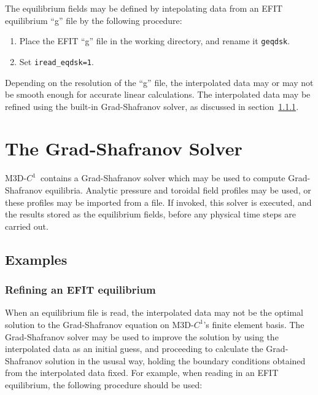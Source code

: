 \documentclass[letterpaper]{book}
\newcommand{\codename}{\textsc{M3D-$C^1$}}
\begin{document}
The equilibrium fields may be defined by intepolating data from an
EFIT equilibrium ``g'' file by the following procedure:

\begin{enumerate}
\item Place the EFIT ``g'' file in the working directory, and rename
  it \texttt{geqdsk}.
\item Set \texttt{iread\_eqdsk=1}.
\end{enumerate}

Depending on the resolution of the ``g'' file, the interpolated data
may or may not be smooth enough for accurate linear calculations.  The
interpolated data may be refined using the built-in Grad-Shafranov
solver, as discussed in section~\ref{sec:gs_efit}.


\section{The Grad-Shafranov Solver}

\codename\ contains a Grad-Shafranov solver which may be used to
compute Grad-Shafranov equilibria.  Analytic pressure and toroidal
field profiles may be used, or these profiles may be imported from a
file.  If invoked, this solver is executed, and the results stored as
the equilibrium fields, before any physical time steps are carried
out.

\subsection{Examples}

\subsubsection{Refining an EFIT equilibrium}
\label{sec:gs_efit}

When an equilibrium file is read, the interpolated data may not be the
optimal solution to the Grad-Shafranov equation on \codename's finite
element basis.  The Grad-Shafranov solver may be used to improve the
solution by using the interpolated data as an initial guess, and
proceeding to calculate the Grad-Shafranov solution in the ususal way,
holding the boundary conditions obtained from the interpolated data
fixed.  For example, when reading in an EFIT equilibrium, the following
procedure should be used:
\end{document}

